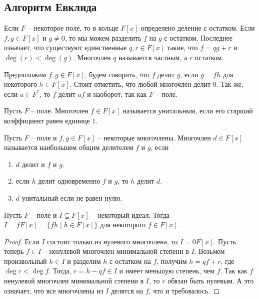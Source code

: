 \subsection{Алгоритм Евклида}

Если $F$ -- некоторое поле, то в кольце $F[x]$ определено деление с остатком.
Если $f, g \in F[x]$ и $g\neq 0$, то мы можем разделить $f$ на $g$ с остатком.
Последнее означает, что существуют единственные $q, r\in F[x]$ такие, что $f = q g + r$ и $\deg(r) < \deg (g)$.
Многочлен $q$ называется частным, а $r$ остатком.

Предположим $f, g\in F[x]$, будем говорить, что $f$ делит $g$, если $g = fh$ для некоторого $h\in F[x]$.
Стоит отметить, что любой многочлен делит $0$.
Так же, если $a\in F^*$, то $f$ делит $af$ и наоборот, так как $F$ -- поле.

\begin{definition}
Пусть $F$ -- поле.
Многочлен $f\in F[x]$ называется унитальным, если его старший коэффициент равен единице $1$.
\end{definition}

\begin{definition}
Пусть $F$ -- поле и $f, g\in F[x]$ -- некоторые многочлены.
Многочлен $d\in F[x]$ называется наибольшем общим делителем $f$ и $g$, если
\begin{enumerate}
\item $d$ делит и $f$ и $g$.

\item если $h$ делит одновременно $f$ и $g$, то $h$ делит $d$.

\item $d$ унитальный если не равен нулю.
\end{enumerate}
\end{definition}


\begin{claim}
\label{claim::PolyIdeals}
Пусть $F$ -- поле и $I\subseteq F[x]$ -- некоторый идеал.
Тогда $I = f F[x] = \{fh\mid h\in F[x]\}$ для некоторого $f\in F[x]$.
\end{claim}
\begin{proof}
Если $I$ состоит только из нулевого многочлена, то $I = 0 F[x]$.
Пусть теперь $f\in I$ -- ненулевой многочлен минимальной степени в $I$.
Возьмем произвольный $h\in I$ и разделим $h$ с остатком на $f$, получим $h = qf + r$, где $\deg r < \deg f$.
Тогда, $r = h - qf \in I$ и имеет меньшую степень, чем $f$.
Так как $f$ ненулевой многочлен минимальной степени в $I$, то $r$ обязан быть нулевым.
А это означает, что все многочлены из $I$ делятся на $f$, что и требовалось.
\end{proof}

